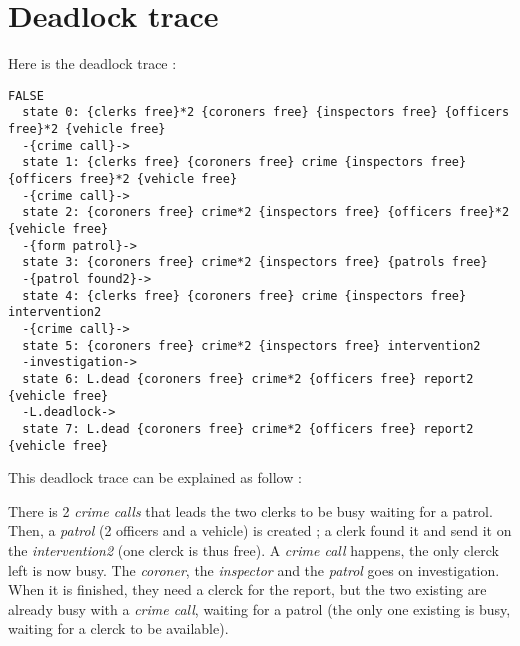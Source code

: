 \section{Deadlock trace}
\label{sec:Deadlock trace}

\lstset{
    frame=single,
    breaklines=true
}

Here is the deadlock trace :

\begin{lstlisting}
FALSE
  state 0: {clerks free}*2 {coroners free} {inspectors free} {officers free}*2 {vehicle free}
  -{crime call}->
  state 1: {clerks free} {coroners free} crime {inspectors free} {officers free}*2 {vehicle free}
  -{crime call}->
  state 2: {coroners free} crime*2 {inspectors free} {officers free}*2 {vehicle free}
  -{form patrol}->
  state 3: {coroners free} crime*2 {inspectors free} {patrols free}
  -{patrol found2}->
  state 4: {clerks free} {coroners free} crime {inspectors free} intervention2
  -{crime call}->
  state 5: {coroners free} crime*2 {inspectors free} intervention2
  -investigation->
  state 6: L.dead {coroners free} crime*2 {officers free} report2 {vehicle free}
  -L.deadlock->
  state 7: L.dead {coroners free} crime*2 {officers free} report2 {vehicle free}
\end{lstlisting}

This deadlock trace can be explained as follow : \newline

There is 2 \textit{crime calls} that leads the two clerks to be busy waiting for a patrol. Then, a \textit{patrol} (2 officers and a vehicle) is created ; a clerk found it and send it on the \textit{intervention2} (one clerck is thus free). A \textit{crime call} happens, the only clerck left is now busy. The \textit{coroner}, the \textit{inspector} and the \textit{patrol} goes on investigation. When it is finished, they need a clerck for the report, but the two existing are already busy with a \textit{crime call}, waiting for a patrol (the only one existing is busy, waiting for a clerck to be available). \newline
